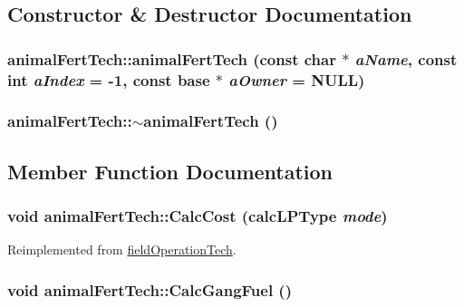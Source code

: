 \subsection{Constructor \& Destructor Documentation}
\hypertarget{classanimal_fert_tech_a57e661e6eb7baae179ceade5a9ea5271}{
\subsubsection[{animalFertTech}]{\setlength{\rightskip}{0pt plus 5cm}animalFertTech::animalFertTech (const char $\ast$ {\em aName}, \/  const int {\em aIndex} = {\ttfamily -\/1}, \/  const {\bf base} $\ast$ {\em aOwner} = {\ttfamily NULL})}}
\label{classanimal_fert_tech_a57e661e6eb7baae179ceade5a9ea5271}
\hypertarget{classanimal_fert_tech_a09f5c3ecb3cbffb70da9f76e2f280b17}{
\subsubsection[{$\sim$animalFertTech}]{\setlength{\rightskip}{0pt plus 5cm}animalFertTech::$\sim$animalFertTech ()}}
\label{classanimal_fert_tech_a09f5c3ecb3cbffb70da9f76e2f280b17}


\subsection{Member Function Documentation}
\hypertarget{classanimal_fert_tech_ab2e8f130cf259ed4c7669e92ff1bfebe}{
\subsubsection[{CalcCost}]{\setlength{\rightskip}{0pt plus 5cm}void animalFertTech::CalcCost ({\bf calcLPType} {\em mode})}}
\label{classanimal_fert_tech_ab2e8f130cf259ed4c7669e92ff1bfebe}


Reimplemented from \hyperlink{classfield_operation_tech_a908e81a53479de1a6768d58964dbc57c}{fieldOperationTech}.\hypertarget{classanimal_fert_tech_a3847a22b473b9a09f5e524c165ae0484}{
\subsubsection[{CalcGangFuel}]{\setlength{\rightskip}{0pt plus 5cm}void animalFertTech::CalcGangFuel ()}}
\label{classanimal_fert_tech_a3847a22b473b9a09f5e524c165ae0484}


